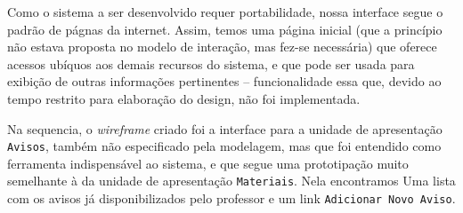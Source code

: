 			Como o sistema a ser desenvolvido requer portabilidade, nossa 
			interface segue o padrão de págnas da internet. Assim, temos uma página 
			inicial (que a princípio não estava proposta no modelo de interação, mas fez-se
			necessária) que oferece acessos ubíquos aos demais recursos do sistema, e que 
			pode ser usada para exibição de outras informações pertinentes -- funcionalidade essa que, devido ao 
			tempo restrito para elaboração do design, não foi implementada.
			
		
			Na sequencia, o \emph{wireframe} criado foi a interface para a unidade de 
			apresentação \texttt{Avisos}, também não especificado pela modelagem, mas que foi 
			entendido como ferramenta indispensável ao sistema, e que segue uma prototipação
			muito semelhante à da unidade de apresentação \texttt{Materiais}. Nela encontramos 
			Uma lista com os avisos já disponibilizados 
			pelo professor e um link \texttt{Adicionar Novo Aviso}.	
		
		
		
		
